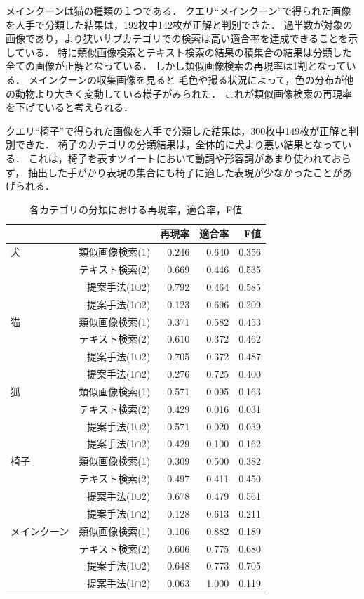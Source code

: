 \documentclass{deimj}
\begin{document}
メインクーンは猫の種類の１つである．
クエリ“メインクーン”で得られた画像を人手で分類した結果は，192枚中142枚が正解と判別できた．
過半数が対象の画像であり，より狭いサブカテゴリでの検索は高い適合率を達成できることを示している．
特に類似画像検索とテキスト検索の結果の積集合の結果は分類した全ての画像が正解となっている．
しかし類似画像検索の再現率は1割となっている．
メインクーンの収集画像を見ると
毛色や撮る状況によって，色の分布が他の動物より大きく変動している様子がみられた．
これが類似画像検索の再現率を下げていると考えられる．


クエリ“椅子”で得られた画像を人手で分類した結果は，300枚中149枚が正解と判別できた．
椅子のカテゴリの分類結果は，全体的に犬より悪い結果となっている．
これは，椅子を表すツイートにおいて動詞や形容詞があまり使われておらず，
抽出した手がかり表現の集合にも椅子に適した表現が少なかったことがあげられる．

\begin{table}[tb]
\begin{center}
\caption{各カテゴリの分類における再現率，適合率，F値}
\label{tab:result-ex}
\begin{tabular}{|l|r|r|r|r|}\hline
&& 再現率& 適合率& F値\\ \hline \hline
犬
& 類似画像検索(1)& 0.246& 0.640& 0.356 \\ \cline{2-5}
& テキスト検索(2)& 0.669& 0.446& 0.535 \\ \cline{2-5}
& 提案手法(1$\cup$2)& 0.792& 0.464& 0.585 \\ \cline{2-5}
& 提案手法(1$\cap$2)& 0.123& 0.696& 0.209 \\ \hline
猫
& 類似画像検索(1)& 0.371& 0.582& 0.453 \\ \cline{2-5}
& テキスト検索(2)& 0.610& 0.372& 0.462 \\ \cline{2-5}
& 提案手法(1$\cup$2)& 0.705& 0.372& 0.487 \\ \cline{2-5}
& 提案手法(1$\cap$2)& 0.276& 0.725& 0.400 \\ \hline
狐
& 類似画像検索(1)& 0.571& 0.095& 0.163 \\ \cline{2-5}
& テキスト検索(2)& 0.429& 0.016& 0.031 \\ \cline{2-5}
& 提案手法(1$\cup$2)& 0.571& 0.020& 0.039 \\ \cline{2-5}
& 提案手法(1$\cap$2)& 0.429& 0.100& 0.162 \\ \hline
椅子
& 類似画像検索(1)& 0.309& 0.500& 0.382 \\ \cline{2-5}
& テキスト検索(2)& 0.497& 0.411& 0.450 \\ \cline{2-5}
& 提案手法(1$\cup$2)& 0.678& 0.479& 0.561 \\ \cline{2-5}
& 提案手法(1$\cap$2)& 0.128& 0.613& 0.211 \\ \hline
メインクーン
& 類似画像検索(1)& 0.106& 0.882& 0.189 \\ \cline{2-5}
& テキスト検索(2)& 0.606& 0.775& 0.680 \\ \cline{2-5}
& 提案手法(1$\cup$2)& 0.648& 0.773& 0.705 \\ \cline{2-5}
& 提案手法(1$\cap$2)& 0.063& 1.000& 0.119 \\ \hline
\end{tabular}
\end{center}
\end{table}
\end{document}
